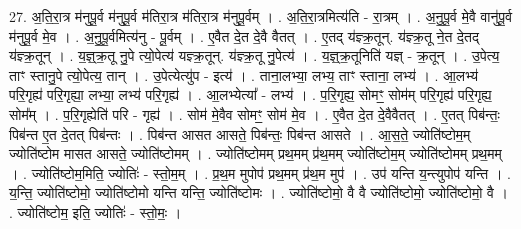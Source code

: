 \documentclass[17pt]{extarticle}
\begin{document}
27. अ॒ति॒रा॒त्र म॑नुपू॒र्व म॑नुपू॒र्व म॑तिरा॒त्र म॑तिरा॒त्र म॑नुपू॒र्वम् । . अ॒ति॒रा॒त्रमित्य॑ति - रा॒त्रम् । . अ॒नु॒पू॒र्व मे॒वै वानु॑पू॒र्व म॑नुपू॒र्व मे॒व । . अ॒नु॒पू॒र्वमित्य॑नु - पू॒र्वम् । . ए॒वैत दे॒त दे॒वै वैतत् । . ए॒तद् य॑ज्ञ्क्र॒तून्. य॑ज्ञ्क्र॒तू ने॒त दे॒तद् य॑ज्ञ्क्र॒तून् । . य॒ज्ञ्॒क्र॒तू नु॒पे त्यो॒पेत्य॑ यज्ञ्क्र॒तून्. य॑ज्ञ्क्र॒तू नु॒पेत्य॑ । . य॒ज्ञ्॒क्र॒तूनिति॑ यज्ञ् - क्र॒तून् । . उ॒पेत्य॒ ताꣳ स्तानु॒पे त्यो॒पेत्य॒ तान् । . उ॒पेत्येत्यु॑प - इत्य॑ । . ताना॒लभ्या॒ लभ्य॒ ताꣳ स्ताना॒ लभ्य॑ । . आ॒लभ्य॑ परि॒गृह्य॑ परि॒गृह्या॒ लभ्या॒ लभ्य॑ परि॒गृह्य॑ । . आ॒लभ्येत्या᳚ - लभ्य॑ । . प॒रि॒गृह्य॒ सोमꣳ॒॒ सोम॑म् परि॒गृह्य॑ परि॒गृह्य॒ सोम᳚म् । . प॒रि॒गृह्येति॑ परि - गृह्य॑ । . सोम॑ मे॒वैव सोमꣳ॒॒ सोम॑ मे॒व । . ए॒वैत दे॒त दे॒वैवैतत् । . ए॒तत् पिब॑न्तः॒ पिब॑न्त ए॒त दे॒तत् पिब॑न्तः । . पिब॑न्त आसत आसते॒ पिब॑न्तः॒ पिब॑न्त आसते । . आ॒स॒ते॒ ज्योति॑ष्टोम॒म् ज्योति॑ष्टोम मासत आसते॒ ज्योति॑ष्टोमम् । . ज्योति॑ष्टोमम् प्रथ॒मम् प्र॑थ॒मम् ज्योति॑ष्टोम॒म् ज्योति॑ष्टोमम् प्रथ॒मम् । . ज्योति॑ष्टोम॒मिति॒ ज्योतिः॑ - स्तो॒म॒म् । . प्र॒थ॒म मुपोप॑ प्रथ॒मम् प्र॑थ॒म मुप॑ । . उप॑ यन्ति य॒न्त्युपोप॑ यन्ति । . य॒न्ति॒ ज्योति॑ष्टोमो॒ ज्योति॑ष्टोमो यन्ति यन्ति॒ ज्योति॑ष्टोमः । . ज्योति॑ष्टोमो॒ वै वै ज्योति॑ष्टोमो॒ ज्योति॑ष्टोमो॒ वै । . ज्योति॑ष्टोम॒ इति॒ ज्योतिः॑ - स्तो॒मः॒ । \newline
\end{document}
